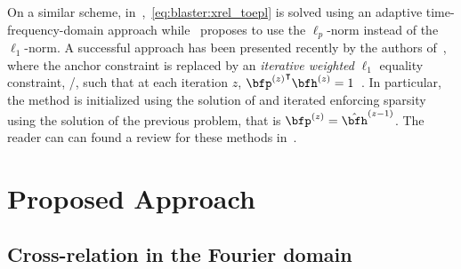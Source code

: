 \mynewline
On a similar scheme, in~,~\cref{eq:blaster:xrel_toepl} is solved using an adaptive time-frequency-domain approach while~ proposes to use the $\ell_p$-norm instead of the $\ell_1$-norm.
A successful approach has been presented recently by the authors of~, where the anchor constraint is replaced by an \textit{iterative weighted} $\ell_1$ equality constraint, \ie/, such that at each iteration $z$, $\ktranspose{\bfp^{(z)}}\bfh^{(z)} = 1$~.
In particular, the method is initialized using the solution of  and iterated enforcing sparsity using the solution of the previous problem, that is $\bfp^{(z)} = \hat{\bfh}^{(z-1)}$.
The reader can can found a review for these methods in~.

\section{Proposed Approach}
\subsection{Cross-relation in the Fourier domain}

\newcommand{\paramVec}[1]{\Delta_{#1}}

